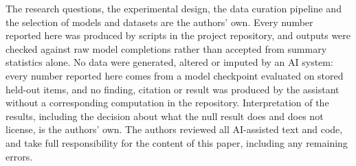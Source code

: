 \documentclass[10pt,twocolumn,letterpaper]{article}
\begin{document}
The research questions, the experimental design, the data curation pipeline and
the selection of models and datasets are the authors' own. Every number
reported here was produced by scripts in the project repository, and outputs
were checked against raw model completions rather than accepted from summary
statistics alone. No data were generated, altered or imputed by an AI system: every number
reported here comes from a model checkpoint evaluated on stored held-out items,
and no finding, citation or result was produced by the assistant without a
corresponding computation in the repository. Interpretation of the results,
including the decision about what the null result does and does not license, is
the authors' own. The authors reviewed all AI-assisted text and code, and take
full responsibility for the content of this paper, including any remaining
errors.

%
%
%
\printbibliography
\end{document}
